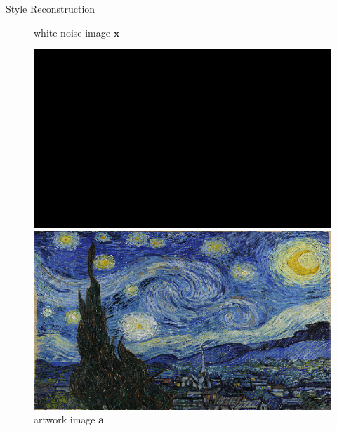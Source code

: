 \documentclass{beamer}
\begin{document}
\begin{frame}{Style Reconstruction}
\begin{figure}[ht]
    \begin{minipage}[b]{0.45\linewidth}
        \centering
        \caption{white noise image $\mathbf{x}$}
        \includegraphics[width=\textwidth]{img/style/noise.png}
    \end{minipage}
    \hspace{0.5cm}
    \begin{minipage}[b]{0.45\linewidth}
        \centering
        \caption{artwork image $\mathbf{a}$}
        \includegraphics[width=\textwidth]{img/style/starry_night.png}
    \end{minipage}
\end{figure}
\end{frame}
\end{document}

